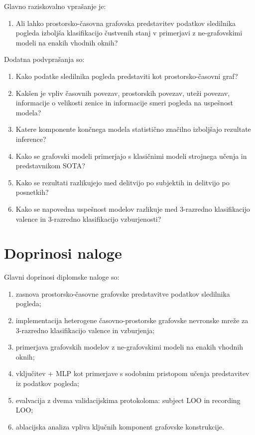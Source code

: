 Glavno raziskovalno vprašanje je:

\begin{enumerate}[label=\textbf{RV\arabic*:}]
    \item Ali lahko prostorsko-časovna grafovska predstavitev podatkov sledilnika pogleda izboljša klasifikacijo čustvenih stanj v primerjavi z ne-grafovskimi modeli na enakih vhodnih oknih?
\end{enumerate}

Dodatna podvprašanja so:

\begin{enumerate}[label=\textbf{PV\arabic*:}]
    \item Kako podatke sledilnika pogleda predstaviti kot prostorsko-časovni graf?
    \item Kakšen je vpliv časovnih povezav, prostorskih povezav, uteži povezav, informacije o velikosti zenice in informacije smeri pogleda na uspešnost modela?
    \item Katere komponente končnega modela statistično značilno izboljšajo rezultate inference?
    \item Kako se grafovski modeli primerjajo s klasičnimi modeli strojnega učenja in predstavnikom SOTA?
    \item Kako se rezultati razlikujejo med delitvijo po subjektih in delitvijo po posnetkih?
    \item Kako se napovedna uspešnost modelov razlikuje med 3-razredno klasifikacijo valence in 3-razredno klasifikacijo vzburjenosti?
\end{enumerate}

\section{Doprinosi naloge}
\label{subsec:prispevki}

Glavni doprinosi diplomske naloge so:

\begin{enumerate}
    \item zasnova prostorsko-časovne grafovske predstavitve podatkov sledilnika pogleda;
    \item implementacija heterogene časovno-prostorske grafovske nevronske mreže za 3-razredno klasifikacijo valence in vzburjenja;
    \item primerjava grafovskih modelov z ne-grafovskimi modeli na enakih vhodnih oknih;
    \item vključitev \GazeMAE{} + MLP kot primerjave s sodobnim pristopom učenja predstavitev iz podatkov pogleda;
    \item evalvacija z dvema validacijskima protokoloma: subject LOO in recording LOO;
    \item ablacijska analiza vpliva ključnih komponent grafovske konstrukcije.
\end{enumerate}

